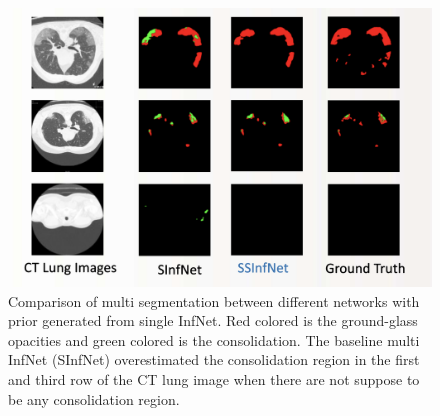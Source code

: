   \begin{figure}
 	\includegraphics[width=\linewidth]{comparison_multi_weakprior.png}
 	\caption{Comparison of multi segmentation between different networks with prior generated from single InfNet. Red colored is the ground-glass opacities and green colored is the consolidation. The baseline multi InfNet (SInfNet) overestimated the consolidation region in the first and third row of the CT lung image when there are not suppose to be any consolidation region.}
 	\label{fig:multi-weakprior-comparison}
 \end{figure}
